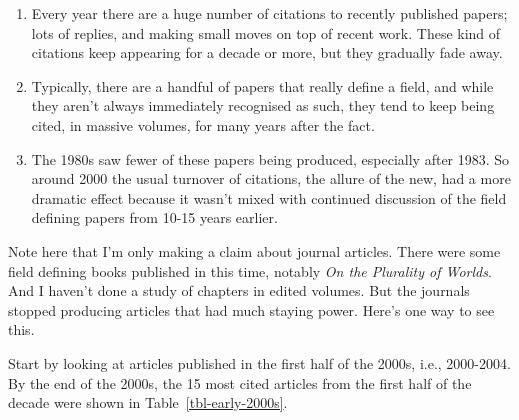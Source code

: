 \documentclass[
  11pt,
  letterpaper,
  DIV=11,
  numbers=noendperiod,
  twoside]{scrartcl}
\providecommand{\tightlist}{%
  \setlength{\itemsep}{0pt}\setlength{\parskip}{0pt}}
\begin{document}
\begin{enumerate}
\def\labelenumi{\arabic{enumi}.}
\tightlist
\item
  Every year there are a huge number of citations to recently published
  papers; lots of replies, and making small moves on top of recent work.
  These kind of citations keep appearing for a decade or more, but they
  gradually fade away.
\item
  Typically, there are a handful of papers that really define a field,
  and while they aren't always immediately recognised as such, they tend
  to keep being cited, in massive volumes, for many years after the
  fact.
\item
  The 1980s saw fewer of these papers being produced, especially after
  1983. So around 2000 the usual turnover of citations, the allure of
  the new, had a more dramatic effect because it wasn't mixed with
  continued discussion of the field defining papers from 10-15 years
  earlier.
\end{enumerate}

Note here that I'm only making a claim about journal articles. There
were some field defining books published in this time, notably \emph{On
the Plurality of Worlds}. And I haven't done a study of chapters in
edited volumes. But the journals stopped producing articles that had
much staying power. Here's one way to see this.

Start by looking at articles published in the first half of the 2000s,
i.e., 2000-2004. By the end of the 2000s, the 15 most cited articles
from the first half of the decade were shown in
Table~\ref{tbl-early-2000s}.
\end{document}
